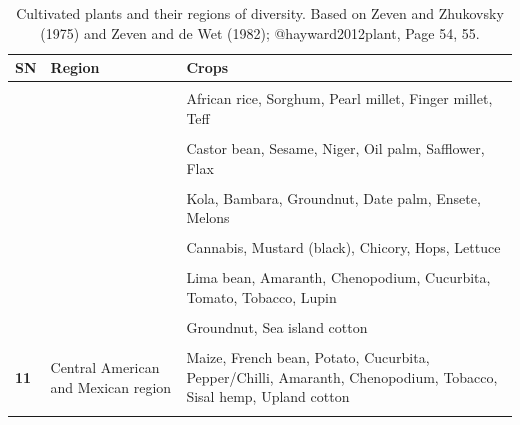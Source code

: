 \documentclass[
  ignorenonframetext,
  aspectratio=169]{beamer}
\begin{document}
\begin{frame}{}
\protect\hypertarget{section-19}{}
\begin{table}

\caption{\label{tab:diversity-region3}Cultivated plants and their regions of diversity. Based on Zeven and Zhukovsky (1975) and Zeven and de Wet (1982); @hayward2012plant, Page 54, 55.}
\centering
\fontsize{6}{8}\selectfont
\begin{tabular}[t]{>{\raggedright\arraybackslash}p{3em}>{\raggedright\arraybackslash}p{14em}>{\raggedright\arraybackslash}p{32em}}
\toprule
SN & Region & Crops\\
\midrule
\textbf{\cellcolor{gray!6}{8}} & \cellcolor{gray!6}{African region} & \cellcolor{gray!6}{Wheat (Durum, Emmer, Poulard, Bread)}\\
\textbf{} &  & African rice, Sorghum, Pearl millet, Finger millet, Teff\\
\textbf{\cellcolor{gray!6}{}} & \cellcolor{gray!6}{} & \cellcolor{gray!6}{Cowpea, Bottle gourd, Okra, Yams, Cucumber}\\
\textbf{} &  & Castor bean, Sesame, Niger, Oil palm, Safflower, Flax\\
\textbf{\cellcolor{gray!6}{}} & \cellcolor{gray!6}{} & \cellcolor{gray!6}{Cotton, Kenaf, Coffee}\\
\addlinespace
\textbf{} &  & Kola, Bambara, Groundnut, Date palm, Ensete, Melons\\
\textbf{\cellcolor{gray!6}{9}} & \cellcolor{gray!6}{European-siberian region} & \cellcolor{gray!6}{Peach, Pear, Plum, Apricot, Apple, Almond, Walnut, Pistachio, Cherry}\\
\textbf{} &  & Cannabis, Mustard (black), Chicory, Hops, Lettuce\\
\textbf{\cellcolor{gray!6}{10}} & \cellcolor{gray!6}{South American region} & \cellcolor{gray!6}{Potato, Sweet potato, Xanthosoma}\\
\textbf{} &  & Lima bean, Amaranth, Chenopodium, Cucurbita, Tomato, Tobacco, Lupin\\
\addlinespace
\textbf{\cellcolor{gray!6}{}} & \cellcolor{gray!6}{} & \cellcolor{gray!6}{Papaya, Pineapple}\\
\textbf{} &  & Groundnut, Sea island cotton\\
\textbf{\cellcolor{gray!6}{}} & \cellcolor{gray!6}{} & \cellcolor{gray!6}{Cassava, Cacao, Rubber tree, Passion fruit}\\
\textbf{11} & Central American and Mexican region & Maize, French bean, Potato, Cucurbita, Pepper/Chilli, Amaranth, Chenopodium, Tobacco, Sisal hemp, Upland cotton\\
\textbf{\cellcolor{gray!6}{12}} & \cellcolor{gray!6}{North American region} & \cellcolor{gray!6}{Jeruselum artichoke, Sunflower, Plum, Raspberry, Strawberry}\\
\bottomrule
\end{tabular}
\end{table}
\end{frame}
\end{document}

